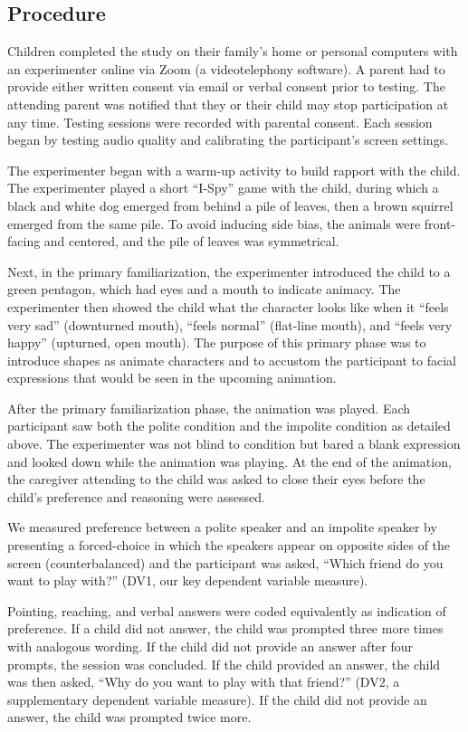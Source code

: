 \documentclass[
  english,
  man,floatsintext]{apa6}
\begin{document}
\hypertarget{procedure}{%
\subsection{Procedure}\label{procedure}}

Children completed the study on their family's home or personal computers with an experimenter online via Zoom (a videotelephony software). A parent had to provide either written consent via email or verbal consent prior to testing. The attending parent was notified that they or their child may stop participation at any time. Testing sessions were recorded with parental consent. Each session began by testing audio quality and calibrating the participant's screen settings.

The experimenter began with a warm-up activity to build rapport with the child. The experimenter played a short ``I-Spy'' game with the child, during which a black and white dog emerged from behind a pile of leaves, then a brown squirrel emerged from the same pile. To avoid inducing side bias, the animals were front-facing and centered, and the pile of leaves was symmetrical.

Next, in the primary familiarization, the experimenter introduced the child to a green pentagon, which had eyes and a mouth to indicate animacy. The experimenter then showed the child what the character looks like when it ``feels very sad'' (downturned mouth), ``feels normal'' (flat-line mouth), and ``feels very happy'' (upturned, open mouth). The purpose of this primary phase was to introduce shapes as animate characters and to accustom the participant to facial expressions that would be seen in the upcoming animation.

After the primary familiarization phase, the animation was played. Each participant saw both the polite condition and the impolite condition as detailed above. The experimenter was not blind to condition but bared a blank expression and looked down while the animation was playing. At the end of the animation, the caregiver attending to the child was asked to close their eyes before the child's preference and reasoning were assessed.

We measured preference between a polite speaker and an impolite speaker by presenting a forced-choice in which the speakers appear on opposite sides of the screen (counterbalanced) and the participant was asked, ``Which friend do you want to play with?'' (DV1, our key dependent variable measure).

Pointing, reaching, and verbal answers were coded equivalently as indication of preference. If a child did not answer, the child was prompted three more times with analogous wording. If the child did not provide an answer after four prompts, the session was concluded. If the child provided an answer, the child was then asked, ``Why do you want to play with that friend?'' (DV2, a supplementary dependent variable measure). If the child did not provide an answer, the child was prompted twice more.
\end{document}
